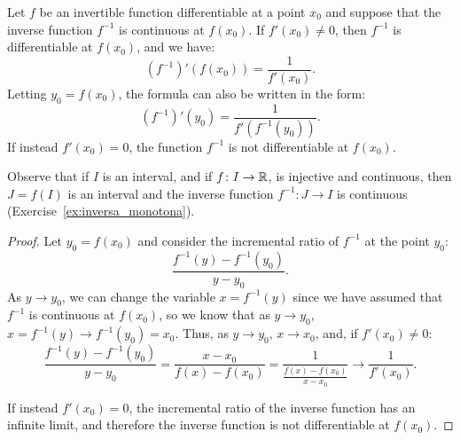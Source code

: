 \begin{theorem}
\mymark{**}
Let $f$ be an invertible function differentiable at a point $x_0$ and
suppose that the inverse function $f^{-1}$ is continuous at $f(x_0)$.
If $f'(x_0)\neq 0$, then $f^{-1}$ is differentiable at $f(x_0)$, and we have:
\[
  (f^{-1})'(f(x_0)) = \frac{1}{f'(x_0)}.
\]
Letting $y_0 = f(x_0)$, the formula can also be written in the form:
\[
  (f^{-1})'(y_0) = \frac{1}{f'(f^{-1}(y_0))}.
\]
If instead $f'(x_0)=0$, the function $f^{-1}$ is not differentiable at $f(x_0)$.
\end{theorem}
%
Observe that 
if $I$ is an interval,
and if $f\colon I\to {\mathbb R}$,
is injective and continuous, then $J=f(I)$ is an interval
and the inverse function $f^{-1}\colon J\to I$
is continuous (Exercise~\ref{ex:inversa_monotona}).
%
\begin{proof}
\mymark{**}
Let $y_0 = f(x_0)$ and consider the incremental ratio of $f^{-1}$ at the point
$y_0$:
\[
  \frac{f^{-1}(y) - f^{-1}(y_0)}{y-y_0}.
\]
As $y\to y_0$, we can change the variable
$x=f^{-1}(y)$ since we have assumed that $f^{-1}$ is continuous at $f(x_0)$, so
we know that as $y\to y_0$, $x = f^{-1}(y)\to f^{-1}(y_0) = x_0$.
Thus, as $y\to y_0$, $x\to x_0$, and,
if $f'(x_0)\neq 0$:
\[
  \frac{f^{-1}(y) - f^{-1}(y_0)}{y-y_0}
  = \frac{x-x_0}{f(x)-f(x_0)}
  = \frac{1}{\frac{f(x)-f(x_0)}{x-x_0}} \to \frac{1}{f'(x_0)}.
\]

If instead $f'(x_0)=0$, the incremental ratio of the inverse function
has an infinite limit, and therefore the inverse function is not differentiable
at $f(x_0)$.
\end{proof}

